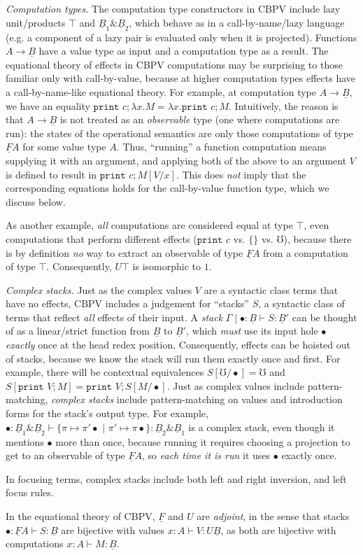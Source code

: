 \documentclass[acmsmall,nonacm]{acmart}
\renewcommand{\u}{\underline}
\newcommand{\pipe}{\,\,|\,\,}
\newcommand{\pair}[2]{\{ \pi \mapsto {#1} \pipe \pi' \mapsto {#2}\}}
\newcommand{\err}{\mho}
\newcommand{\print}{\kw{print}}
\newcommand{\kw}[1]{\texttt{#1}\,\,}
\newcommand{\with}{\mathbin{\&}}
\begin{document}
\emph{Computation types.}
The computation type constructors in CBPV include lazy unit/products
$\top$ and $\u B_1 \with \u B_2$, which behave as in a call-by-name/lazy
language (e.g. a component of a lazy pair is evaluated only when it is
projected).  Functions $A \to \u B$ have a value type as input and a
computation type as a result.  The equational theory of effects in CBPV
computations may be surprising to those familiar only with
call-by-value, because at higher computation types effects have a
call-by-name-like equational theory.  For example, at computation type
$A \to \u B$, we have an equality $\print c; \lambda x. M = \lambda
x.\print c; M$.  Intuitively, the reason is that $A \to \u B$ is not
treated as an \emph{observable} type (one where computations are run):
the states of the operational semantics are only those computations of
type $\u F A$ for some value type $A$.  Thus, ``running'' a function
computation means supplying it with an argument, and applying both of
the above to an argument $V$ is defined to result in $\print c;M[V/x]$.
This does \emph{not} imply that the corresponding equations holds for
the call-by-value function type, which we discuss below.
\begin{longonly}
As another
example, \emph{all} computations are considered equal at type $\top$,
even computations that perform different effects ($\print c$ vs. $\{\}$
vs. $\err$), because there is by definition \emph{no} way to extract an
observable of type $\u F A$ from a computation of type $\top$.
Consequently, $U \top$ is isomorphic to $1$.
\end{longonly}

\emph{Complex stacks.} Just as the complex values $V$ are a syntactic
class terms that have no effects, CBPV includes a judgement for
``stacks'' $S$, a syntactic class of terms that reflect \emph{all}
effects of their input.  A \emph{stack} $\Gamma \mid \bullet : \u B
\vdash S : \u B'$ can be thought of as a linear/strict function from $\u
B$ to $\u B'$, which \emph{must} use its input hole $\bullet$
\emph{exactly} once at the head redex position.  Consequently, effects
can be hoisted out of stacks, because we know the stack will run them
exactly once and first.  For example, there will be contextual
equivalences $S[\err/\bullet] = \err$ and $S[\print V;M] = \print
V;S[M/\bullet]$.  Just as complex values include pattern-matching,
\emph{complex stacks} include pattern-matching on values and
introduction forms for the stack's output type.  For example, $\bullet :
\u B_1 \with \u B_2 \vdash \pair{\pi' \bullet}{\pi \bullet} : \u B_2
\with \u B_1$ is a complex stack, even though it mentions $\bullet$ more
than once, because running it requires choosing a projection to get to
an observable of type $\u F A$, so \emph{each time it is run} it uses
$\bullet$ exactly once.
\begin{longonly}
In
focusing terms, complex stacks include both left and right inversion,
and left focus rules.
\end{longonly}
In the equational theory of CBPV, $\u F$ and $U$
are \emph{adjoint}, in the sense that stacks $\bullet : \u F A \vdash S
: \u B$ are bijective with values $x : A \vdash V : U \u B$, as both are
bijective with computations $x : A \vdash M : \u B$.
\end{document}
